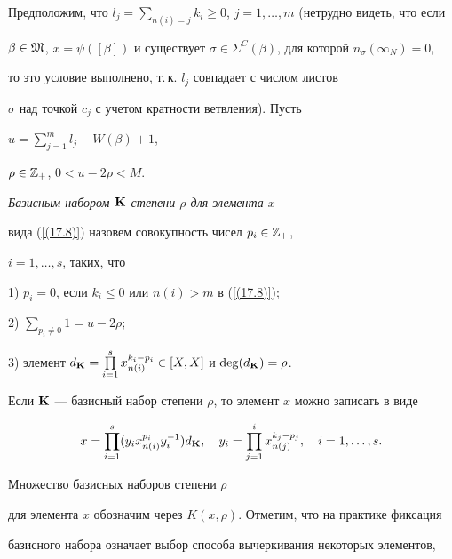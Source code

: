 Предположим, что $l_j=\sum\limits_{n(i)=j}


k_i\ge0$, $j=1,\dotsc,m$ (нетрудно видеть, что если


$\beta\in\frak M$, $x=\psi([\beta])$ и существует $\sigma\in


\Sigma^{{C}} (\beta)$, для которой $n_\sigma(\infty_N)=0$,


то это условие выполнено, т.\,к. $l_j$ совпадает с числом листов


$\sigma$ над точкой $c_j$ с учетом кратности ветвления). Пусть


$u=\sum\limits^m_{j=1}l_j-W(\beta)+1$,


$\rho\in\Bbb Z_+$, $0<u-2\rho <M$.


{\it Базисным набором $\bold K$ степени $\rho $ для элемента $x$}


вида (\ref{(17.8)}) назовем совокупность чисел $p_i\in\Bbb Z_+$,


$i=1,\dotsc,s$, таких, что





1) $p_i=0$, если $k_i\le 0$ или $n(i)>m$ в (\ref{(17.8)});





2) $\sum\limits_{p_i\ne0}1=u-2\rho$;





3) элемент $d_{\bold K}=\PL_{i=1}^s


x^{k_i-p_i}_{n(i)}\in[X,X]$ и $\deg(d_{\bold K})=\rho$.





Если $\bold K$ --- базисный набор степени $\rho $, то элемент $x$ можно записать в виде


\begin{equation}


x=\prod_{i=1}^s(y_i x^{p_i}_{n(i)}


y^{-1}_{i})d_{\bold K}, \quad 


y_i=\prod_{j=1}^i x^{k_j-p_j}_{n(j)},\quad i=1,\dotsc,s.


\label{(17.9)}


\end{equation}


Множество базисных наборов степени $\rho$


для элемента $x$ обозначим через $K(x,\rho)$. Отметим, что на практике фиксация 


базисного набора означает выбор способа вычеркивания некоторых элементов, 


